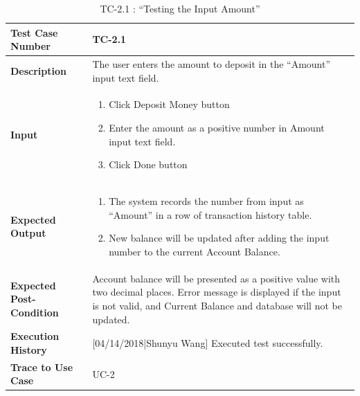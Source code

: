 \documentclass[12pt]{article}
\begin{document}
\begin{table}[H]
\caption{TC-2.1 : “Testing the Input Amount”}
\begin{center}
\begin{tabular}{|p{5.5	cm}|p{11cm}|}
\hline
\bf Test Case Number & 
TC-2.1 \\
\hline
\bf Description & 
The user enters the amount to deposit in the “Amount” input text field.\\
\hline
\bf Input & 
\begin{enumerate}
  \item Click Deposit Money button
  \item Enter the amount as a positive number in Amount input text field.
  \item Click Done button
\end{enumerate} \\
\hline
\bf Expected Output & 
\begin{enumerate}
  \item The system records the number from input as “Amount” in a row of transaction history table.
  \item New balance will be updated after adding the input number to the current Account Balance.
\end{enumerate} \\
\hline
\bf Expected Post-Condition & 
Account balance will be presented as a positive value with two decimal places. Error message is displayed if the input is not valid, and Current Balance and database will not be updated.\\
\hline
\bf Execution History & 
[04/14/2018|Shunyu Wang] Executed test successfully.\\
\hline
\bf Trace to Use Case & 
UC-2\\
\hline

\end{tabular}
\end{center}
\end{table}
\end{document}
